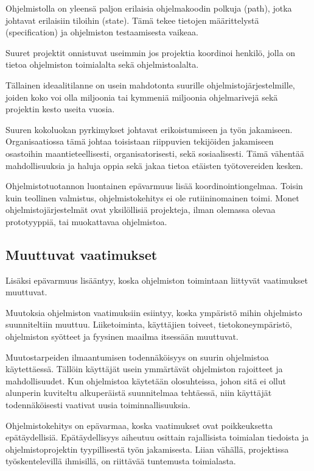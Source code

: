 \documentclass[finnish]{tktltiki2}
\theoremstyle{definition}
\theoremstyle{remark}
\begin{document}
Ohjelmistolla on yleensä paljon erilaisia ohjelmakoodin polkuja (path), jotka johtavat erilaisiin tiloihin (state). Tämä tekee tietojen määrittelystä (specification) ja ohjelmiston testaamisesta vaikeaa\cite{BOE06}.

Suuret projektit onnistuvat useimmin jos projektia koordinoi henkilö, jolla on tietoa ohjelmiston toimialalta sekä ohjelmistoalalta\cite{KES95}.

Tällainen ideaalitilanne on usein mahdotonta suurille ohjelmistojärjestelmille, joiden koko voi olla miljoonia tai kymmeniä miljoonia ohjelmarivejä sekä projektin kesto useita vuosia\cite{KES95}.

Suuren kokoluokan pyrkimykset johtavat erikoistumiseen ja työn jakamiseen. Organisaatiossa tämä johtaa toisistaan riippuvien tekijöiden jakamiseen osastoihin maantieteellisesti, organisatorisesti, sekä sosiaalisesti. Tämä vähentää mahdollisuuksia ja haluja oppia sekä jakaa tietoa etäisten työtovereiden kesken\cite{KES95}.

Ohjelmistotuotannon luontainen epävarmuus lisää koordinointiongelmaa. Toisin kuin teollinen valmistus, ohjelmistokehitys ei ole rutiininomainen toimi. Monet ohjelmistojärjestelmät ovat yksilöllisiä projekteja, ilman olemassa olevaa prototyyppiä, tai muokattavaa ohjelmistoa\cite{KES95}.

\subsection{Muuttuvat vaatimukset}

Lisäksi epävarmuus lisääntyy, koska ohjelmiston toimintaan liittyvät vaatimukset muuttuvat\cite{KES95}.

Muutoksia ohjelmiston vaatimuksiin esiintyy, koska ympäristö mihin ohjelmisto suunniteltiin muuttuu. Liiketoiminta, käyttäjien toiveet, tietokoneympäristö, ohjelmiston syötteet ja fyysinen maailma itsessään muuttuvat\cite{KES95}.

Muutostarpeiden ilmaantumisen todennäköisyys on suurin ohjelmistoa käytettäessä. Tällöin käyttäjät usein ymmärtävät ohjelmiston rajoitteet ja mahdollisuudet. Kun ohjelmistoa käytetään olosuhteissa, johon sitä ei ollut alunperin kuviteltu alkuperäistä suunnitelmaa tehtäessä, niin käyttäjät todennäköisesti vaativat uusia toiminnallisuuksia\cite{KES95}.

Ohjelmistokehitys on epävarmaa, koska vaatimukset ovat poikkeuksetta epätäydellisiä. Epätäydellisyys aiheutuu osittain rajallisista toimialan tiedoista ja ohjelmistoprojektin tyypillisestä työn jakamisesta. Liian vähällä, projektissa työskentelevillä ihmisillä, on riittävää tuntemusta toimialasta\cite{KES95}.
\end{document}
